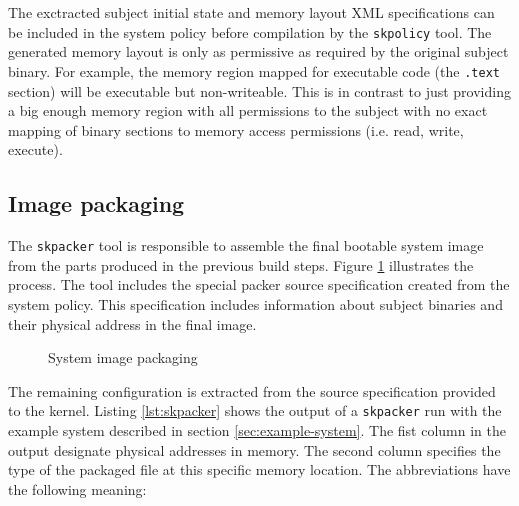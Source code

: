 The exctracted subject initial state and memory layout XML specifications can be
included in the system policy before compilation by the \texttt{skpolicy} tool.
The generated memory layout is only as permissive as required by the original
subject binary. For example, the memory region mapped for executable code
(the \texttt{.text} section) will be executable but non-writeable. This is in
contrast to just providing a big enough memory region with all permissions to
the subject with no exact mapping of binary sections to memory access
permissions (i.e. read, write, execute).

\subsection{Image packaging}\label{subsec:image-packaging}
The \texttt{skpacker} tool is responsible to assemble the final bootable system
image from the parts produced in the previous build steps. Figure
\ref{fig:image-packaging} illustrates the process. The tool includes the special
packer source specification created from the system policy. This specification
includes information about subject binaries and their physical address in the
final image.

\begin{figure}[h]
	\centering
	\caption{System image packaging}
	\label{fig:image-packaging}
\end{figure}

The remaining configuration is extracted from the source specification provided
to the kernel. Listing \ref{lst:skpacker} shows the output of a
\texttt{skpacker} run with the example system described in section
\ref{sec:example-system}. The fist column in the output designate physical
addresses in memory. The second column specifies the type of the packaged file
at this specific memory location. The abbreviations have the following meaning:

